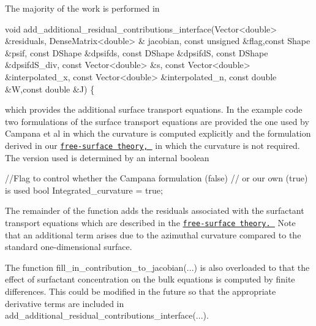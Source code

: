 The majority of the work is performed in 
\begin{DoxyCodeInclude}
  \textcolor{keywordtype}{void} add\_additional\_residual\_contributions\_interface(Vector<double> &residuals, DenseMatrix<double> &
      jacobian,
                                                       \textcolor{keyword}{const} \textcolor{keywordtype}{unsigned} &flag,\textcolor{keyword}{const} Shape &psif, \textcolor{keyword}{const} DShape
       &dpsifds,
                                                       \textcolor{keyword}{const} DShape &dpsifdS, \textcolor{keyword}{const} DShape &dpsifdS\_div,
                                                       \textcolor{keyword}{const} Vector<double> &s,
                                                       \textcolor{keyword}{const} Vector<double> &interpolated\_x, \textcolor{keyword}{const} 
      Vector<double> &interpolated\_n, 
                                                       \textcolor{keyword}{const} \textcolor{keywordtype}{double} &W,\textcolor{keyword}{const} \textcolor{keywordtype}{double} &J)
  \{

\end{DoxyCodeInclude}
 which provides the additional surface transport equations. In the example code two formulations of the surface transport equations are provided the one used by Campana et al in which the curvature is computed explicitly and the formulation derived in our \href{../../../navier_stokes/surface_theory/html/index.html}{\tt free-\/surface theory, } in which the curvature is not required. The version used is determined by an internal boolean 
\begin{DoxyCodeInclude}
   \textcolor{comment}{//Flag to control whether the Campana formulation (false) }
   \textcolor{comment}{// or our own (true) is used}
   \textcolor{keywordtype}{bool} Integrated\_curvature = \textcolor{keyword}{true};

\end{DoxyCodeInclude}
 The remainder of the function adds the residuals associated with the surfactant transport equations which are described in the \href{../../../navier_stokes/surface_theory/html/index.html}{\tt free-\/surface theory. } Note that an additional term arises due to the azimuthal curvature compared to the standard one-\/dimensional surface.

The function {\ttfamily fill\+\_\+in\+\_\+contribution\+\_\+to\+\_\+jacobian}(...) is also overloaded to that the effect of surfactant concentration on the bulk equations is computed by finite differences. This could be modified in the future so that the appropriate derivative terms are included in {\ttfamily add\+\_\+additional\+\_\+residual\+\_\+contributions\+\_\+interface}(...).

